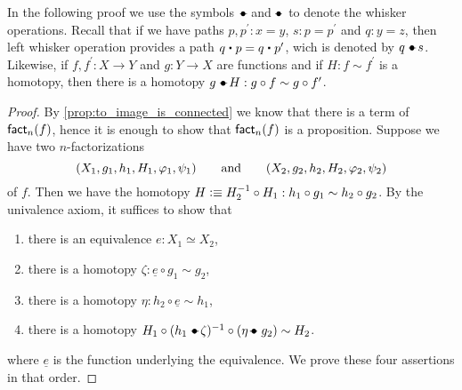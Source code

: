 In the following proof we use the symbols $\mathbin{-\!\!\!\!\bullet}$ and $\mathbin{\bullet\!\!\!\!-}$ to denote the whisker operations. Recall that if we have paths
$p,p^\prime:x= y$, $s:p= p^\prime$ and $q:y= z$, then left whisker operation provides a path $q\ct p=
q\ct p^\prime$, wich is denoted by $q\mathbin{-\!\!\!\!\bullet} s$. Likewise, if $f,f^\prime:X\to Y$ and $g:Y\to X$ are functions and if $H:f\sim
f^\prime$ is a homotopy, then there is a homotopy $g\mathbin{-\!\!\!\!\bullet} H:g\circ f\sim g\circ f^\prime$.

\begin{proof}
By \autoref{prop:to_image_is_connected} we know that there is a term of $\textsf{fact}_n(f)$, hence it is enough to
show that $\textsf{fact}_n(f)$ is a proposition. Suppose we have two $n$-factorizations
\begin{equation*}
{(X_1,g_1,h_1,H_1,\varphi_1,\psi_1)}\qquad\text{and}\qquad{(X_2,g_2,h_2,H_2,\varphi_2,\psi_2)}
\end{equation*}
of $f$. Then we have the homotopy $H\vcentcolon\equiv H_2^{-1}\circ H_1:h_1\circ g_1\sim h_2\circ g_2$. By the univalence axiom, it suffices to show that
\begin{enumerate}
\item there is an equivalence $e:X_1\simeq X_2$,
\item there is a homotopy $\zeta:\underline{e}\circ g_1\sim g_2$,
\item there is a homotopy $\eta:h_2\circ\underline{e}\sim h_1$,
\item there is a homotopy $H_1 \circ(h_1\leftwhisker\zeta)^{-1}\circ(\eta\rightwhisker g_2)\sim H_2$.
\end{enumerate}
where $\underline{e}$ is the function underlying the equivalence. We prove these four assertions in that order.
\end{proof}
